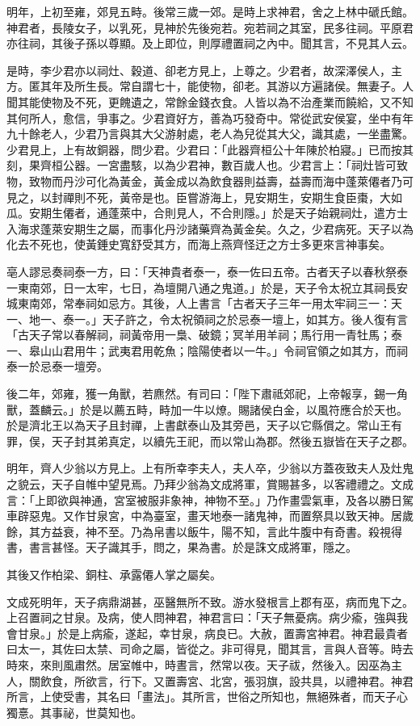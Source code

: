 \begin{pinyinscope}
明年，上初至雍，郊見五畤。後常三歲一郊。是時上求神君，舍之上林中磃氏館。神君者，長陵女子，以乳死，見神於先後宛若。宛若祠之其室，民多往祠。平原君亦往祠，其後子孫以尊顯。及上即位，則厚禮置祠之內中。聞其言，不見其人云。

是時，李少君亦以祠灶、穀道、卻老方見上，上尊之。少君者，故深澤侯人，主方。匿其年及所生長。常自謂七十，能使物，卻老。其游以方遍諸侯。無妻子。人聞其能使物及不死，更餽遺之，常餘金錢衣食。人皆以為不治產業而饒給，又不知其何所人，愈信，爭事之。少君資好方，善為巧發奇中。常從武安侯宴，坐中有年九十餘老人，少君乃言與其大父游射處，老人為兒從其大父，識其處，一坐盡驚。少君見上，上有故銅器，問少君。少君曰：「此器齊桓公十年陳於柏寢。」已而按其刻，果齊桓公器。一宮盡駭，以為少君神，數百歲人也。少君言上：「祠灶皆可致物，致物而丹沙可化為黃金，黃金成以為飲食器則益壽，益壽而海中蓬萊僊者乃可見之，以封禪則不死，黃帝是也。臣嘗游海上，見安期生，安期生食臣棗，大如瓜。安期生僊者，通蓬萊中，合則見人，不合則隱。」於是天子始親祠灶，遣方士入海求蓬萊安期生之屬，而事化丹沙諸藥齊為黃金矣。久之，少君病死。天子以為化去不死也，使黃錘史寬舒受其方，而海上燕齊怪迂之方士多更來言神事矣。

亳人謬忌奏祠泰一方，曰：「天神貴者泰一，泰一佐曰五帝。古者天子以春秋祭泰一東南郊，日一太牢，七日，為壇開八通之鬼道。」於是，天子令太祝立其祠長安城東南郊，常奉祠如忌方。其後，人上書言「古者天子三年一用太牢祠三一：天一、地一、泰一。」天子許之，令太祝領祠之於忌泰一壇上，如其方。後人復有言「古天子常以春解祠，祠黃帝用一梟、破鏡；冥羊用羊祠；馬行用一青牡馬；泰一、皋山山君用牛；武夷君用乾魚；陰陽使者以一牛。」令祠官領之如其方，而祠泰一於忌泰一壇旁。

後二年，郊雍，獲一角獸，若麃然。有司曰：「陛下肅祗郊祀，上帝報享，錫一角獸，蓋麟云。」於是以薦五畤，畤加一牛以燎。賜諸侯白金，以風符應合於天也。於是濟北王以為天子且封禪，上書獻泰山及其旁邑，天子以它縣償之。常山王有罪，俣，天子封其弟真定，以續先王祀，而以常山為郡。然後五嶽皆在天子之郡。

明年，齊人少翁以方見上。上有所幸李夫人，夫人卒，少翁以方蓋夜致夫人及灶鬼之貌云，天子自帷中望見焉。乃拜少翁為文成將軍，賞賜甚多，以客禮禮之。文成言：「上即欲與神通，宮室被服非象神，神物不至。」乃作畫雲氣車，及各以勝日駕車辟惡鬼。又作甘泉宮，中為臺室，畫天地泰一諸鬼神，而置祭具以致天神。居歲餘，其方益衰，神不至。乃為帛書以飯牛，陽不知，言此牛腹中有奇書。殺視得書，書言甚怪。天子識其手，問之，果為書。於是誅文成將軍，隱之。

其後又作柏梁、銅柱、承露僊人掌之屬矣。

文成死明年，天子病鼎湖甚，巫醫無所不致。游水發根言上郡有巫，病而鬼下之。上召置祠之甘泉。及病，使人問神君，神君言曰：「天子無憂病。病少瘉，強與我會甘泉。」於是上病瘉，遂起，幸甘泉，病良已。大赦，置壽宮神君。神君最貴者曰太一，其佐曰太禁、司命之屬，皆從之。非可得見，聞其言，言與人音等。時去時來，來則風肅然。居室帷中，時晝言，然常以夜。天子祓，然後入。因巫為主人，關飲食，所欲言，行下。又置壽宮、北宮，張羽旗，設共具，以禮神君。神君所言，上使受書，其名曰「畫法」。其所言，世俗之所知也，無絕殊者，而天子心獨憙。其事祕，世莫知也。


\end{pinyinscope}
